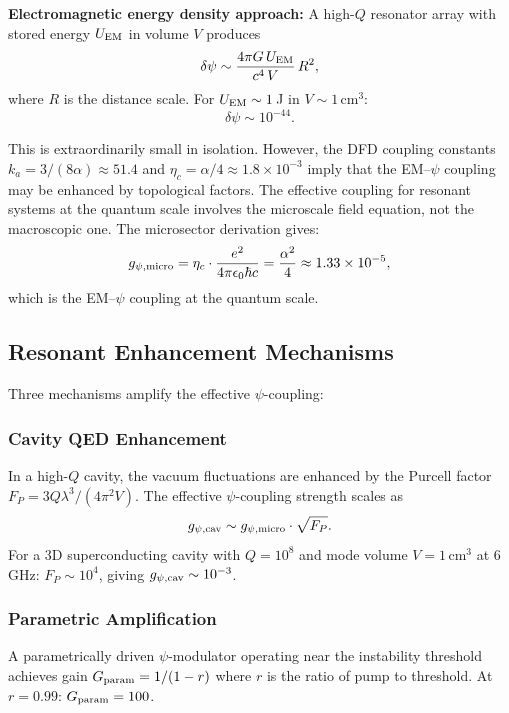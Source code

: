 \documentclass[aps,prd,twocolumn,superscriptaddress,nofootinbib]{revtex4-2}
\begin{document}
\textbf{Electromagnetic energy density approach:} A high-$Q$ resonator
array with stored energy $U_{\rm EM}$ in volume $V$ produces
\begin{equation}
\delta\psi \sim \frac{4\pi G\,U_{\rm EM}}{c^4\,V}\,R^2,
\end{equation}
where $R$ is the distance scale. For $U_{\rm EM} \sim 1$\,J in
$V \sim 1$\,cm$^3$:
\begin{equation}
\delta\psi \sim 10^{-44}.
\end{equation}

This is extraordinarily small in isolation. However, the DFD coupling
constants $k_a = 3/(8\alpha) \approx 51.4$ and $\eta_c = \alpha/4 \approx 1.8
\times 10^{-3}$ imply that the EM--$\psi$ coupling may be enhanced by
topological factors. The effective coupling for resonant systems at the
quantum scale involves the microscale field equation, not the macroscopic
one. The microsector derivation gives:
\begin{equation}\label{eq:micro-coupling}
g_{\psi,\rm micro} = \eta_c \cdot \frac{e^2}{4\pi\epsilon_0\hbar c}
= \frac{\alpha^2}{4} \approx 1.33 \times 10^{-5},
\end{equation}
which is the EM--$\psi$ coupling at the quantum scale.

\subsection{Resonant Enhancement Mechanisms}

Three mechanisms amplify the effective $\psi$-coupling:

\subsubsection{Cavity QED Enhancement}
In a high-$Q$ cavity, the vacuum fluctuations are enhanced by the Purcell
factor $F_P = 3Q\lambda^3/(4\pi^2 V)$. The effective $\psi$-coupling
strength scales as
\begin{equation}
g_{\psi,\rm cav} \sim g_{\psi,\rm micro} \cdot \sqrt{F_P}.
\end{equation}
For a 3D superconducting cavity with $Q = 10^8$ and mode volume
$V = 1$\,cm$^3$ at 6\,GHz: $F_P \sim 10^4$, giving $g_{\psi,\rm cav}
\sim 10^{-3}$.

\subsubsection{Parametric Amplification}
A parametrically driven $\psi$-modulator operating near the instability
threshold achieves gain $G_{\rm param} = 1/(1 - r)$ where $r$ is the
ratio of pump to threshold. At $r = 0.99$: $G_{\rm param} = 100$.
\end{document}
